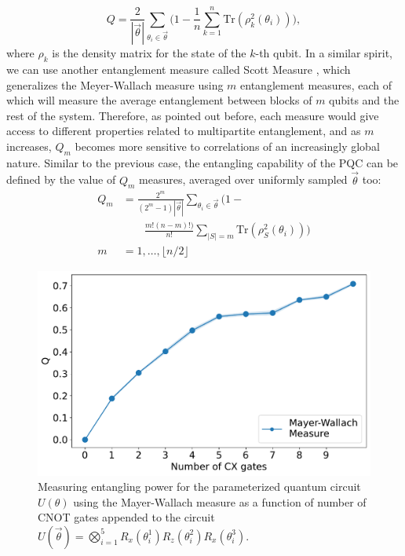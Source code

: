 \documentclass[%
 reprint,
 amsmath,
 amssymb,
 showkeys,
 pra,
 floatfix,
]{revtex4-2}
\begin{document}
\begin{equation}
	Q = \frac{2}{|\vec{\theta}|}\sum_{\theta_{i}\in \vec{\theta}}\Bigg(1-\frac{1}{n}\sum_{k=1}^{n}\text{Tr}(\rho_{k}^{2}(\theta_{i}))\Bigg),
\end{equation}
where $\rho_k$ is the density matrix for the state of the $k$-th qubit. In a similar spirit, we can use another entanglement measure called Scott Measure \cite{10.1007/s11128-007-0052-7}, which generalizes the Meyer-Wallach measure using $m$ entanglement measures, each of which will measure the average entanglement between blocks of $m$ qubits and the rest of the system. Therefore, as pointed out before, each measure would give access to different properties related to multipartite entanglement, and as $m$ increases, $Q_m$ becomes more sensitive to correlations of an increasingly global nature. Similar to the previous case, the entangling capability of the PQC can be defined by the value of $Q_m$ measures, averaged over uniformly sampled $\vec{\theta}$ too:
\begin{equation}
    \begin{split}
        Q_{m} &= \frac{2^{m}}{(2^{m}-1) |\vec{\theta}|}\sum_{\theta_i \in \vec{\theta}} \bigg(1 - \\ 
        & \quad \quad \frac{m! (n-m)!)}{n!}\sum_{|S|=m} \text{Tr} (\rho_{S}^2 (\theta_i)) \bigg) \\
        m &= 1, \ldots, \lfloor n/2 \rfloor
    \end{split}
\end{equation}
\begin{figure}[!t]
    \centering
    \includegraphics[width=\linewidth]{images/entanglement-capability.pdf}
    \caption[Visualizing entanglement spectrum for parameterized quantum circuits]{Measuring entangling power for the parameterized quantum circuit $U(\theta)$ using the Mayer-Wallach measure as a function of number of CNOT gates appended to the circuit $U(\vec{\theta}) = \bigotimes_{i=1}^{5}R_x(\theta_i^1)R_z(\theta_i^2)R_x(\theta_i^3)$.}
    \label{fig:entanglement-capability}
\end{figure}
\end{document}
